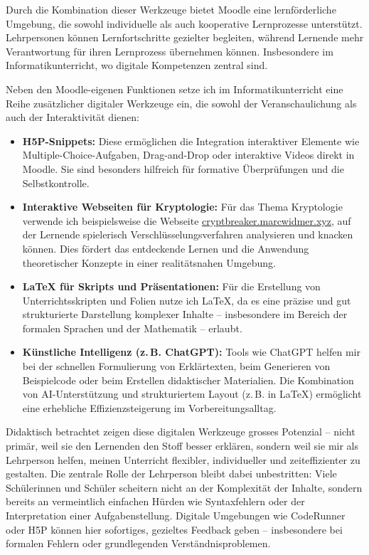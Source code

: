 Durch die Kombination dieser Werkzeuge bietet Moodle eine lernförderliche Umgebung, die sowohl individuelle als auch kooperative Lernprozesse unterstützt. Lehrpersonen können Lernfortschritte gezielter begleiten, während Lernende mehr Verantwortung für ihren Lernprozess übernehmen können. Insbesondere im Informatikunterricht, wo digitale Kompetenzen zentral sind.

Neben den Moodle-eigenen Funktionen setze ich im Informatikunterricht eine Reihe zusätzlicher digitaler Werkzeuge ein, die sowohl der Veranschaulichung als auch der Interaktivität dienen:

\begin{itemize}
  \item \textbf{H5P-Snippets:} Diese ermöglichen die Integration interaktiver Elemente wie Multiple-Choice-Aufgaben, Drag-and-Drop oder interaktive Videos direkt in Moodle. Sie sind besonders hilfreich für formative Überprüfungen und die Selbstkontrolle.
  \item \textbf{Interaktive Webseiten für Kryptologie:} Für das Thema Kryptologie verwende ich beispielsweise die Webseite \href{https://cryptbreaker.marcwidmer.xyz}{cryptbreaker.marcwidmer.xyz}, auf der Lernende spielerisch Verschlüsselungsverfahren analysieren und knacken können. Dies fördert das entdeckende Lernen und die Anwendung theoretischer Konzepte in einer realitätsnahen Umgebung.
  \item \textbf{LaTeX für Skripts und Präsentationen:} Für die Erstellung von Unterrichtsskripten und Folien nutze ich LaTeX, da es eine präzise und gut strukturierte Darstellung komplexer Inhalte -- insbesondere im Bereich der formalen Sprachen und der Mathematik -- erlaubt. 
  \item \textbf{Künstliche Intelligenz (z.\,B. ChatGPT):} Tools wie ChatGPT helfen mir bei der schnellen Formulierung von Erklärtexten, beim Generieren von Beispielcode oder beim Erstellen didaktischer Materialien. Die Kombination von AI-Unterstützung und strukturiertem Layout (z.\,B. in LaTeX) ermöglicht eine erhebliche Effizienzsteigerung im Vorbereitungsalltag.
\end{itemize}

Didaktisch betrachtet zeigen diese digitalen Werkzeuge grosses Potenzial -- nicht primär, weil sie den Lernenden den Stoff besser erklären, sondern weil sie mir als Lehrperson helfen, meinen Unterricht flexibler, individueller und zeiteffizienter zu gestalten. Die zentrale Rolle der Lehrperson bleibt dabei unbestritten: Viele Schülerinnen und Schüler scheitern nicht an der Komplexität der Inhalte, sondern bereits an vermeintlich einfachen Hürden wie Syntaxfehlern oder der Interpretation einer Aufgabenstellung. Digitale Umgebungen wie CodeRunner oder H5P können hier sofortiges, gezieltes Feedback geben -- insbesondere bei formalen Fehlern oder grundlegenden Verständnisproblemen.

